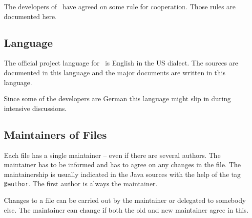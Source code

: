 The developers of \ExTeX\ have agreed on some rule for cooperation.
Those rules are documented here.

\subsection{Language}

The official project language for \ExTeX\ is English in the US
dialect. The sources are documented in this language and the major
documents are written in this language.

Since some of the developers are German this language might slip in
during intensive discussions.


\subsection{Maintainers of Files}

Each file has a single maintainer -- even if there are several
authors. The maintainer has to be informed and has to agree on any
changes in the file. The maintainership is usually indicated in the
Java sources with the help of the tag \texttt{@author}.
The first author is always the maintainer.

Changes to a file can be carried out by the maintainer or delegated to
somebody else. The maintainer can change if both the old and new
maintainer agree in this.

